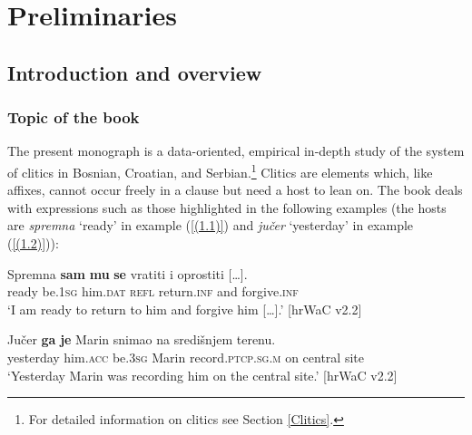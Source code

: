 \part{Preliminaries}
\label{part1}
\chapter{Introduction and overview}
\label{Introduction with overview}
\section{Topic of the book}
The present monograph is a data-oriented, empirical in-depth study of the system of clitics in Bosnian, Croatian, and Serbian.\footnote{For detailed information on clitics see Section \ref{Clitics}.} Clitics are elements which, like affixes, cannot occur freely in a clause but need a host to lean on. The book deals with expressions such as those highlighted in the following examples (the hosts are \textit{spremna} `ready' in example (\ref{(1.1)}) and \textit{jučer} `yesterday' in example (\ref{(1.2)})):

\begin{exe}
\ex\label{(1.1)}
\gll Spremna \textbf{sam} \textbf{mu} \textbf{se} vratiti i {oprostiti [\dots].}\\
ready be.\textsc{1sg} him.\textsc{dat} \textsc{refl} return.\textsc{inf} and forgive.\textsc{inf}\\
\glt `I am ready to return to him and forgive him [\dots].'
\hfill [hrWaC v2.2]

\ex\label{(1.2)}
\gll Jučer \textbf{ga} \textbf{je} Marin snimao na središnjem terenu.\\
yesterday him.\textsc{acc}  be.\textsc{3sg} Marin record.\textsc{ptcp.sg.m} on central site\\
\glt `Yesterday Marin was recording him on the central site.'
\hfill [hrWaC v2.2]
\end{exe}

